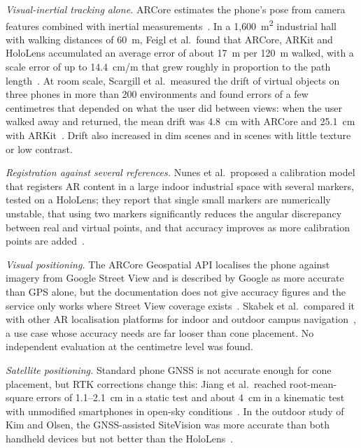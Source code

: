 \textit{Visual-inertial tracking alone.} ARCore estimates the phone's pose from camera features combined with inertial measurements~\cite{arcore}. In a 1{,}600~m\textsuperscript{2} industrial hall with walking distances of 60~m, Feigl et al.\ found that ARCore, ARKit and HoloLens accumulated an average error of about 17~m per 120~m walked, with a scale error of up to 14.4~cm/m that grew roughly in proportion to the path length~\cite{feigl2020}. At room scale, Scargill et al.\ measured the drift of virtual objects on three phones in more than 200 environments and found errors of a few centimetres that depended on what the user did between views: when the user walked away and returned, the mean drift was 4.8~cm with ARCore and 25.1~cm with ARKit~\cite{scargill2021}. Drift also increased in dim scenes and in scenes with little texture or low contrast.

\textit{Registration against several references.} Nunes et al.\ proposed a calibration model that registers AR content in a large indoor industrial space with several markers, tested on a HoloLens; they report that single small markers are numerically unstable, that using two markers significantly reduces the angular discrepancy between real and virtual points, and that accuracy improves as more calibration points are added~\cite{nunes2023}.

\textit{Visual positioning.} The ARCore Geospatial API localises the phone against imagery from Google Street View and is described by Google as more accurate than GPS alone, but the documentation does not give accuracy figures and the service only works where Street View coverage exists~\cite{arcoregeo}. Skabek et al.\ compared it with other AR localisation platforms for indoor and outdoor campus navigation~\cite{skabek2026}, a use case whose accuracy needs are far looser than cone placement. No independent evaluation at the centimetre level was found.

\textit{Satellite positioning.} Standard phone GNSS is not accurate enough for cone placement, but RTK corrections change this: Jiang et al.\ reached root-mean-square errors of 1.1--2.1~cm in a static test and about 4~cm in a kinematic test with unmodified smartphones in open-sky conditions~\cite{jiang2023}. In the outdoor study of Kim and Olsen, the GNSS-assisted SiteVision was more accurate than both handheld devices but not better than the HoloLens~\cite{kim2025isarc}.


